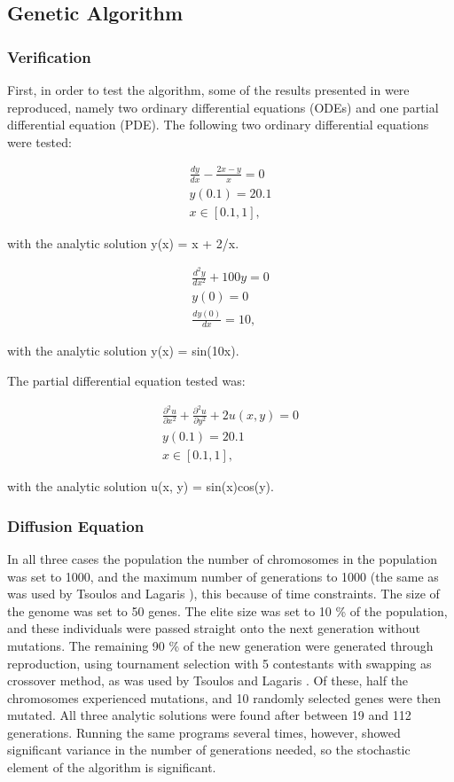 \documentclass[multicolumn, 10pt]{extarticle}
\begin{document}
\subsection{Genetic Algorithm}
\subsubsection{Verification}
First, in order to test the algorithm, some of the results presented in \cite{Lagaris} were reproduced, namely two ordinary differential equations (ODEs) and one partial differential equation (PDE). The following two ordinary differential equations were tested:

\begin{align*}
	\frac{dy}{dx}  - \frac{2x - y}{x} = 0 \\
	y(0.1) = 20.1                         \\
	x \in [0.1, 1],
\end{align*}

with the analytic solution y(x) = x + 2/x.

\begin{align}
	\label{eq:ODE}
	\frac{d^{2}y}{dx^{2}}  + 100y = 0 \\
	y(0) = 0                          \\
	\frac{dy(0)}{dx} = 10,
\end{align}

with the analytic solution y(x) = sin(10x).

The partial differential equation tested was:

\begin{align}
	\label{eq:PDE}
	\frac{\partial^{2}u}{\partial x^{2}} + \frac{\partial^{2}u}{\partial y^{2}} + 2u(x, y) = 0 \\
	y(0.1) = 20.1                                                                              \\
	x \in [0.1, 1],
\end{align}

with the analytic solution u(x, y) = sin(x)cos(y).

\subsubsection{Diffusion Equation}
In all three cases the population the number of chromosomes in the population was set to 1000, and the maximum number of generations to 1000 (the same as was used by Tsoulos and Lagaris \cite{Lagaris}), this because of time constraints. The size of the genome was set to 50 genes. The elite size was set to 10 \% of the population, and these individuals were passed straight onto the next generation without mutations. The remaining 90 \% of the new generation were generated through reproduction, using tournament selection with 5 contestants with swapping as crossover method, as was used by Tsoulos and Lagaris \cite{Lagaris}. Of these, half the chromosomes experienced mutations, and 10 randomly selected genes were then mutated. All three analytic solutions were found after between 19 and 112 generations. Running the same programs several times, however, showed significant variance in the number of generations needed, so the stochastic element of the algorithm is significant.
\end{document}
